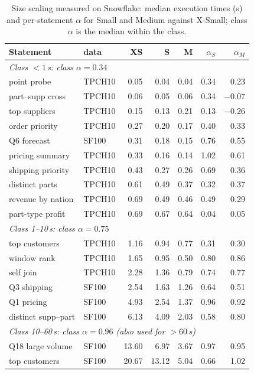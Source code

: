 \documentclass[conference]{IEEEtran}
\begin{document}
\begin{table}[t]
\caption{Size scaling measured on Snowflake: median execution times (s) and per-statement $\alpha$ for Small and Medium
against X-Small; class $\alpha$ is the median within the class.}\label{tab:alpha}
\centering\scriptsize
\setlength{\tabcolsep}{2.8pt}
\begin{tabular}{llrrrrr}
\toprule
Statement & data & XS & S & M & $\alpha_S$ & $\alpha_M$ \\
\midrule
\multicolumn{7}{l}{\emph{Class $<1$\,s: class $\alpha = 0.34$}} \\
point probe        & TPCH10 & 0.05 & 0.04 & 0.04 & 0.34 & 0.23 \\
part--supp cross   & TPCH10 & 0.06 & 0.05 & 0.06 & 0.34 & $-0.07$ \\
top suppliers      & TPCH10 & 0.15 & 0.13 & 0.21 & 0.13 & $-0.26$ \\
order priority     & TPCH10 & 0.27 & 0.20 & 0.17 & 0.40 & 0.33 \\
Q6 forecast        & SF100  & 0.31 & 0.18 & 0.15 & 0.76 & 0.55 \\
pricing summary    & TPCH10 & 0.33 & 0.16 & 0.14 & 1.02 & 0.61 \\
shipping priority  & TPCH10 & 0.43 & 0.27 & 0.26 & 0.69 & 0.36 \\
distinct parts     & TPCH10 & 0.61 & 0.49 & 0.37 & 0.32 & 0.37 \\
revenue by nation  & TPCH10 & 0.69 & 0.49 & 0.46 & 0.49 & 0.29 \\
part-type profit   & TPCH10 & 0.69 & 0.67 & 0.64 & 0.04 & 0.05 \\
\multicolumn{7}{l}{\emph{Class 1--10\,s: class $\alpha = 0.75$}} \\
top customers      & TPCH10 & 1.16 & 0.94 & 0.77 & 0.31 & 0.30 \\
window rank        & TPCH10 & 1.65 & 0.95 & 0.50 & 0.80 & 0.86 \\
self join          & TPCH10 & 2.28 & 1.36 & 0.79 & 0.74 & 0.77 \\
Q3 shipping        & SF100  & 2.54 & 1.63 & 1.26 & 0.64 & 0.51 \\
Q1 pricing         & SF100  & 4.93 & 2.54 & 1.37 & 0.96 & 0.92 \\
distinct supp--part& SF100  & 6.13 & 4.09 & 2.03 & 0.58 & 0.80 \\
\multicolumn{7}{l}{\emph{Class 10--60\,s: class $\alpha = 0.96$ (also used for $>60$\,s)}} \\
Q18 large volume   & SF100  & 13.60 & 6.97 & 3.67 & 0.97 & 0.95 \\
top customers      & SF100  & 20.67 & 13.12 & 5.04 & 0.66 & 1.02 \\
\bottomrule
\end{tabular}
\end{table}
\end{document}
